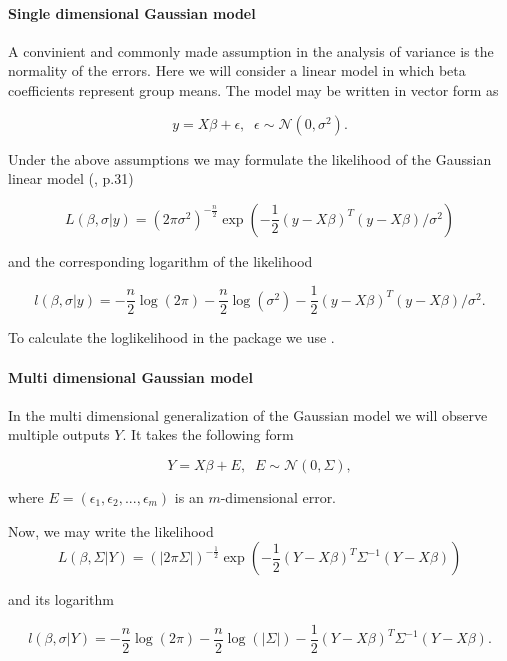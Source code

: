 \break

\paragraph{Single dimensional Gaussian model}

A convinient and commonly made assumption in the analysis of variance is the normality of the errors. Here we will consider a linear model in which beta coefficients represent group means. The model may be written in vector form as

$$y = X \beta + \epsilon, \;\; \epsilon \sim \mathcal{N}\left(0, \sigma^2\right).$$


Under the above assumptions we may formulate the likelihood of the Gaussian linear model (\citealp{friedman2001elements}, p.31)

$$L\left(\beta, \sigma | y\right) = \left(2\pi \sigma^2\right)^{-\frac{n}{2}} 
\exp{\left(-\frac{1}{2}\left(y - X\beta\right)^T\left(y - X\beta\right)/ \sigma^2\right)}$$

and the corresponding logarithm of the likelihood

$$l\left(\beta, \sigma | y\right) = 
-\frac{n}{2} \log{\left(2\pi\right)} -\frac{n}{2} \log{\left(\sigma^2\right)} -\frac{1}{2}\left(y - X\beta\right)^T\left(y - X\beta\right)/ \sigma^2.$$


To calculate the loglikelihood in the package we use .


\paragraph{Multi dimensional Gaussian model} In the multi dimensional generalization of the Gaussian model we will observe multiple outputs $Y$. It takes the following form

$$Y = X \beta + E, \;\; E \sim \mathcal{N}(0, \Sigma),$$

where $E = \left(\epsilon_1, \epsilon_2, ..., \epsilon_m\right)$ is an $m$-dimensional error.

Now, we may write the likelihood 
$$L\left(\beta, \Sigma | Y\right) = \left(|2\pi \Sigma|\right)^{-\frac{1}{2}} 
\exp{\left(-\frac{1}{2}\left(Y - X\beta\right)^T\Sigma^{-1}\left(Y - X\beta\right)\right)}$$

and its logarithm

$$l\left(\beta, \sigma | Y\right) = 
-\frac{n}{2} \log{\left(2\pi\right)} -\frac{n}{2} \log{\left(|\Sigma|\right)} -\frac{1}{2}\left(Y - X\beta\right)^T\Sigma^{-1}\left(Y - X\beta\right).$$

